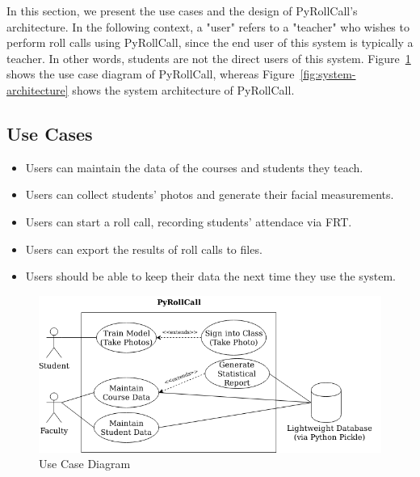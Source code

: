 In this section, we present the use cases and the design of PyRollCall's architecture.
In the following context, a "user" refers to a "teacher" who wishes to perform roll calls
using PyRollCall, since the end user of this system is typically a teacher. In other words,
students are not the direct users of this system.
Figure~\ref{fig:use-case-diagram} shows the use case diagram of PyRollCall, whereas
Figure~\ref{fig:system-architecture} shows the system architecture of PyRollCall.


\subsection{Use Cases}
\vspace{0.5cm}

\begin{itemize}
  \item Users can maintain the data of the courses and students they teach.
  \item Users can collect students' photos and generate their facial measurements.
  \item Users can start a roll call, recording students' attendace via FRT.
  \item Users can export the results of roll calls to files.
  \item Users should be able to keep their data the next time they use the system.
  \end{itemize}
\setstretch{\myContentLineSpacing}

\begin{figure}[!htb]
  \centering
  \vspace{1cm}
  \includegraphics[width=\linewidth]{figures/use-case-diagram.png}
  \caption{Use Case Diagram}
  \label{fig:use-case-diagram}
  \vspace{1cm}
\end{figure}

